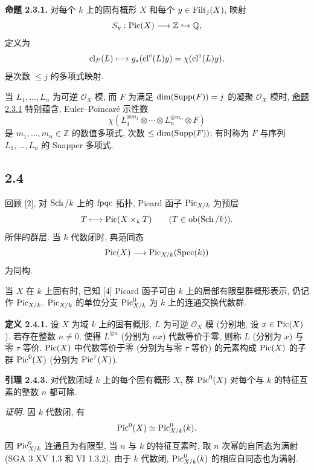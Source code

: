 \textbf{命题 2.3.1.} 对每个 $k$ 上的固有概形 $X$ 和每个 $y\in\operatorname{Filt}_j(X)$, 映射
%
\[
S_y:\operatorname{Pic}(X)\longrightarrow\mathbb Z\hookrightarrow\mathbb Q,
\]
定义为
\[
\operatorname{cl}_P(L)\longmapsto
g_*(\operatorname{cl}^\circ(L)y)=\chi(\operatorname{cl}^\circ(L)y),
\]
是次数 $\leq j$ 的多项式映射.

当 $L_1,\ldots,L_n$ 为可逆 $\mathcal O_X$ 模, 而 $F$ 为满足 $\dim(\operatorname{Supp}(F))=j$ 的凝聚 $\mathcal O_X$ 模时, \hyperlink{sga6.e10.prop.2-3-1}{命题 2.3.1} 特别蕴含, Euler--Poincar\'e 示性数
%
%
\begin{equation}\tag{2.3.2}
\chi(L_1^{\otimes m_1}\otimes\cdots\otimes
L_n^{\otimes m_n}\otimes F)
\end{equation}
是 $m_1,\ldots,m_n\in\mathbb Z$ 的数值多项式, 次数 $\leq\dim(\operatorname{Supp}(F))$; 有时称为 $F$ 与序列 $L_1,\ldots,L_n$ 的 Snapper 多项式.
%
%

\subsection*{2.4} 回顾 [2], 对 $\operatorname{Sch}/k$ 上的 $\mathrm{fpqc}$ 拓扑, Picard 函子 $\operatorname{Pic}_{X/k}$ 为预层
%
%
\[
T\longmapsto\operatorname{Pic}(X\times_kT)
\qquad(T\in\operatorname{ob}(\operatorname{Sch}/k)).
\]
所伴的群层. 当 $k$ 代数闭时, 典范同态
\[
\operatorname{Pic}(X)\longrightarrow\operatorname{Pic}_{X/k}(\operatorname{Spec}(k))
\]
为同构.

当 $X$ 在 $k$ 上固有时, 已知 [4] Picard 函子可由 $k$ 上的局部有限型群概形表示, 仍记作 $\operatorname{Pic}_{X/k}$. $\operatorname{Pic}_{X/k}$ 的单位分支 $\operatorname{Pic}^0_{X/k}$ 为 $k$ 上的连通交换代数群.
%
%
%

\textbf{定义 2.4.1.} 设 $X$ 为域 $k$ 上的固有概形, $L$ 为可逆 $\mathcal O_X$ 模 (分别地, 设 $x\in\operatorname{Pic}(X)$). 若存在整数 $n\ne0$, 使得 $L^{\otimes n}$ (分别为 $nx$) 代数等价于零, 则称 $L$ (分别为 $x$) 与零 $\tau$ 等价. $\operatorname{Pic}(X)$ 中代数等价于零 (分别为与零 $\tau$ 等价) 的元素构成 $\operatorname{Pic}(X)$ 的子群 $\operatorname{Pic}^0(X)$ (分别为 $\operatorname{Pic}^\tau(X)$).
%
%
%
%
%
%
%

\textbf{引理 2.4.3.} 对代数闭域 $k$ 上的每个固有概形 $X$, 群 $\operatorname{Pic}^0(X)$ 对每个与 $k$ 的特征互素的整数 $n$ 都可除.
%
%
%

\emph{证明.} 因 $k$ 代数闭, 有
%
\[
\operatorname{Pic}^0(X)\simeq\operatorname{Pic}^0_{X/k}(k).
\]
因 $\operatorname{Pic}^0_{X/k}$ 连通且为有限型, 当 $n$ 与 $k$ 的特征互素时, 取 $n$ 次幂的自同态为满射 (SGA 3 XV 1.3 和 VI 1.3.2). 由于 $k$ 代数闭, $\operatorname{Pic}^0_{X/k}(k)$ 的相应自同态也为满射.
%
%
%

